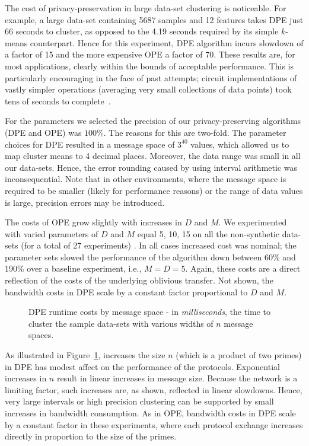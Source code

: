The cost of privacy-preservation in large data-set clustering is
noticeable.  For example, a large data-set containing 5687 samples and
12 features takes DPE just 66 seconds to cluster, as opposed to the
4.19 seconds required by its simple $k$-means counterpart.  Hence for
this experiment, DPE algorithm incurs slowdown of a factor of 15 and the
more expensive OPE a factor of 70.  These results are, for most
applications, clearly within the bounds of acceptable performance.
This is particularly encouraging in the face of past attempts; circuit
implementations of vastly simpler operations (averaging very small
collections of data points) took tens of seconds to
complete~\cite{mnps04}.


For the parameters we selected the precision of our privacy-preserving
algorithms (DPE and OPE) was $100\%$.  The reasons for this are
two-fold.  The parameter choices for DPE resulted in a message space
of $3^{40}$ values, which allowed us to map cluster means to 4 decimal
places.  Moreover, the data range was small in all our data-sets.
Hence, the error rounding caused by using interval arithmetic was
inconsequential.  Note that in other environments, where the message
space is required to be smaller (likely for performance reasons) or
the range of data values is large, precision errors may be introduced.

The costs of OPE grow slightly with increases in $D$ and $M$.  We
experimented with varied parameters of $D$ and $M$ equal 5, 10, 15 on
all the non-synthetic data-sets (for a total of 27 experiments) .  In
all cases increased cost was nominal; the parameter sets slowed the
performance of the algorithm down between 60\% and 190\% over a
baseline experiment, i.e., $M=D=5$.  Again, these costs are a direct
reflection of the costs of the underlying oblivious transfer.  Not
shown, the bandwidth costs in DPE scale by a constant factor
proportional to $D$ and $M$.

\begin{figure}
\begin{center}
\caption{DPE runtime costs by message space - in {\it
milliseconds}, the time to cluster the sample data-sets with various
widths of $n$ message spaces.}
\label{fig:dpe-param}
\end{center}
\end{figure}

As illustrated in Figure~\ref{fig:dpe-param}, increases the size $n$
(which is a product of two primes) in DPE has modest affect on the
performance of the protocols.  Exponential increases in $n$ result in
linear increases in message size.  Because the network is a limiting
factor, such increases are, as shown, reflected in linear slowdowns.
Hence, very large intervals or high precision clustering can be
supported by small increases in bandwidth consumption.  As in OPE,
bandwidth costs in DPE scale by a constant factor in these
experiments, where each protocol exchange increases directly in
proportion to the size of the primes.

